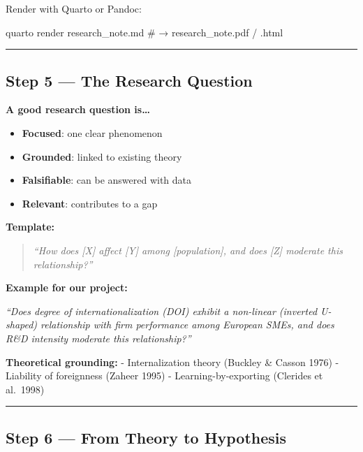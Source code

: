 \documentclass[
  letterpaper,
  DIV=11,
  numbers=noendperiod]{scrartcl}
\newenvironment{Shaded}{\begin{snugshade}}{\end{snugshade}}
\newcommand{\CommentTok}[1]{\textcolor[rgb]{0.37,0.37,0.37}{#1}}
\newcommand{\ExtensionTok}[1]{\textcolor[rgb]{0.00,0.23,0.31}{#1}}
\newcommand{\NormalTok}[1]{\textcolor[rgb]{0.00,0.23,0.31}{#1}}
\providecommand{\tightlist}{%
  \setlength{\itemsep}{0pt}\setlength{\parskip}{0pt}}\usepackage{longtable,booktabs,array}
\begin{document}
Render with Quarto or Pandoc:

\begin{Shaded}
\begin{Highlighting}[]
\ExtensionTok{quarto}\NormalTok{ render research\_note.md}
\CommentTok{\# → research\_note.pdf / .html}
\end{Highlighting}
\end{Shaded}

\begin{center}\rule{0.5\linewidth}{0.5pt}\end{center}

\subsection{Step 5 --- The Research
Question}\label{step-5-the-research-question}

\textbf{A good research question is\ldots{}}

\begin{itemize}
\tightlist
\item
  \textbf{Focused}: one clear phenomenon
\item
  \textbf{Grounded}: linked to existing theory
\item
  \textbf{Falsifiable}: can be answered with data
\item
  \textbf{Relevant}: contributes to a gap
\end{itemize}

\textbf{Template:}

\begin{quote}
\emph{``How does {[}X{]} affect {[}Y{]} among {[}population{]}, and does
{[}Z{]} moderate this relationship?''}
\end{quote}

\textbf{Example for our project:}

\emph{``Does degree of internationalization (DOI) exhibit a non-linear
(inverted U-shaped) relationship with firm performance among European
SMEs, and does R\&D intensity moderate this relationship?''}

\textbf{Theoretical grounding:} - Internalization theory (Buckley \&
Casson 1976) - Liability of foreignness (Zaheer 1995) -
Learning-by-exporting (Clerides et al.~1998)

\begin{center}\rule{0.5\linewidth}{0.5pt}\end{center}

\subsection{Step 6 --- From Theory to
Hypothesis}\label{step-6-from-theory-to-hypothesis}
\end{document}
